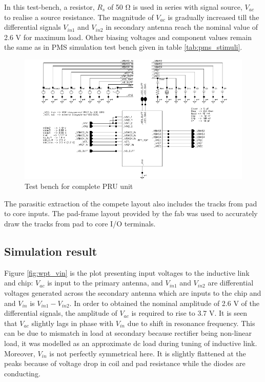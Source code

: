 \documentclass[12pt,a4paper,UKenglish]{report}
\begin{document}
In this test-bench, a resistor, $R_{s}$ of  50 \si{\ohm} is used in series with signal source, $V_{ac}$ to realise a 
source resistance. The magnitude of $V_{ac}$ is gradually increased till the differential signals $V_{in1}$ and $V_{in2}$ 
in secondary antenna reach the nominal value of 2.6 \si{\volt} for maximum load. Other biasing voltages and component 
values remain the same as in PMS simulation test bench given in table \ref{tab:pms_stimuli}. \\

\begin{figure} [H]
  \centering
  \includegraphics[width=1.05\textwidth]{img/wpt_top_testbench.pdf} 
 \caption{Test bench for complete PRU unit } 
\label{fig:wpt_top_link} 
\end{figure}

The parasitic extraction of the compete layout also includes the tracks from pad to core inputs. The pad-frame layout provided by the fab was used to accurately draw the tracks from pad to core I/O terminals. \\

\subsection{Simulation result}	%
Figure \ref{fig:wpt_vin} is the plot presenting input voltages to the inductive link and chip: $V_{ac}$ is input to the 
primary antenna, and $V_{in1}$ and $V_{in2}$ are differential voltages generated across the secondary antenna which are 
inputs to the chip and and 
$V_{in}$ is $V_{in1} - V_{in2}$. In order to obtained the nominal amplitude of 2.6 V of the differential signals, 
the amplitude of $V_{ac}$ is required to rise to 3.7 \si{\volt}. It is seen that $V_{ac}$ slightly lags in phase with $V_{in}$ due to shift 
in resonance frequency. This can be due to mismatch in load at secondary because rectifier being non-linear load, it was 
modelled as an approximate dc load during tuning of inductive link. Moreover, $V_{in}$ is not perfectly symmetrical here. It is slightly 
flattened at the peaks because of voltage drop in coil and pad resistance while the diodes are conducting.\\
\end{document}
